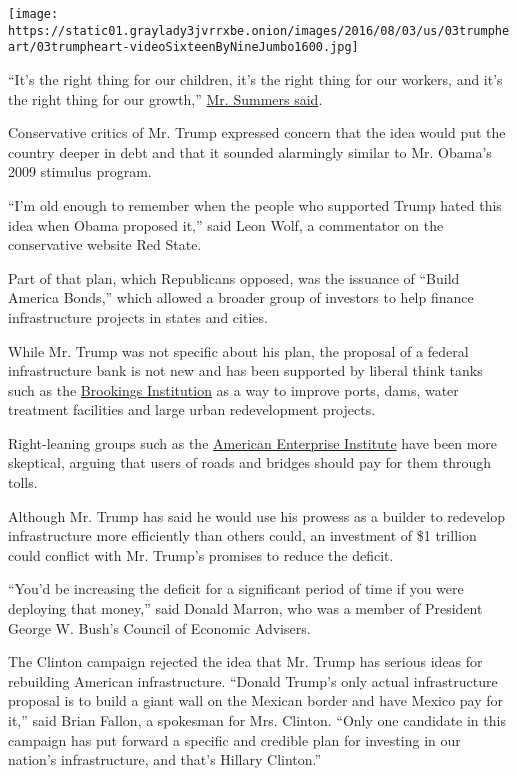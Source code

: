 \texttt{[image: https://static01.graylady3jvrrxbe.onion/images/2016/08/03/us/03trumpheart/03trumpheart-videoSixteenByNineJumbo1600.jpg]}

``It's the right thing for our children, it's the right thing for our
workers, and it's the right thing for our growth,''
\href{http://fortune.com/2016/07/27/larry-summers-2-trillion-for-infrastructure/}{Mr.
Summers said}.

Conservative critics of Mr. Trump expressed concern that the idea would
put the country deeper in debt and that it sounded alarmingly similar to
Mr. Obama's 2009 stimulus program.

``I'm old enough to remember when the people who supported Trump hated
this idea when Obama proposed it,'' said Leon Wolf, a commentator on the
conservative website Red State.

Part of that plan, which Republicans opposed, was the issuance of
``Build America Bonds,'' which allowed a broader group of investors to
help finance infrastructure projects in states and cities.

While Mr. Trump was not specific about his plan, the proposal of a
federal infrastructure bank is not new and has been supported by liberal
think tanks such as the
\href{https://www.brookings.edu/2012/07/16/what-would-an-infrastructure-bank-really-do/}{Brookings
Institution} as a way to improve ports, dams, water treatment facilities
and large urban redevelopment projects.

Right-leaning groups such as the
\href{https://www.aei.org/publication/fantasy-funding-financing-infrastructure/}{American
Enterprise Institute} have been more skeptical, arguing that users of
roads and bridges should pay for them through tolls.

Although Mr. Trump has said he would use his prowess as a builder to
redevelop infrastructure more efficiently than others could, an
investment of \$1 trillion could conflict with Mr. Trump's promises to
reduce the deficit.

``You'd be increasing the deficit for a significant period of time if
you were deploying that money,'' said Donald Marron, who was a member of
President George W. Bush's Council of Economic Advisers.

The Clinton campaign rejected the idea that Mr. Trump has serious ideas
for rebuilding American infrastructure. ``Donald Trump's only actual
infrastructure proposal is to build a giant wall on the Mexican border
and have Mexico pay for it,'' said Brian Fallon, a spokesman for Mrs.
Clinton. ``Only one candidate in this campaign has put forward a
specific and credible plan for investing in our nation's infrastructure,
and that's Hillary Clinton.''

